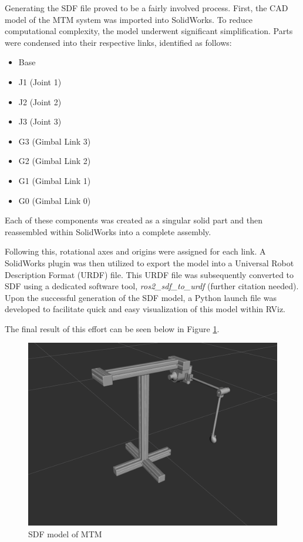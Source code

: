 Generating the SDF file proved to be a fairly involved process. First, the CAD model of the MTM system was imported into SolidWorks. To reduce computational complexity, the model underwent significant simplification. Parts were condensed into their respective links, identified as follows:

\begin{itemize}
    \item Base
    \item J1 (Joint 1)
    \item J2 (Joint 2)
    \item J3 (Joint 3)
    \item G3 (Gimbal Link 3)
    \item G2 (Gimbal Link 2)
    \item G1 (Gimbal Link 1)
    \item G0 (Gimbal Link 0)
\end{itemize}

Each of these components was created as a singular solid part and then reassembled within SolidWorks into a complete assembly.

Following this, rotational axes and origins were assigned for each link. A SolidWorks plugin was then utilized to export the model into a Universal Robot Description Format (URDF) file. This URDF file was subsequently converted to SDF using a dedicated software tool, \textit{ros2\_sdf\_to\_urdf} (further citation needed). Upon the successful generation of the SDF model, a Python launch file was developed to facilitate quick and easy visualization of this model within RViz.

The final result of this effort can be seen below in Figure \ref{fig:mtm_sdf_model}.

\begin{figure}[h]
    \centering
    \includegraphics[width=0.75\linewidth]{figures/mtm_sdf_model.png}
    \caption{SDF model of MTM}
    \label{fig:mtm_sdf_model}
\end{figure}

